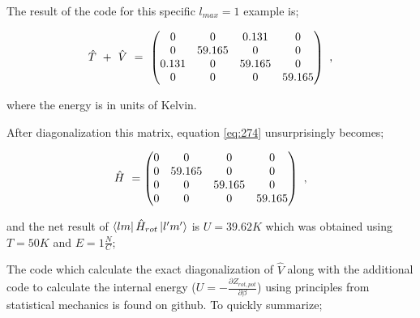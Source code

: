 \documentclass{article}
\begin{document}
The result of the code for this specific \begin{math} l_{max} = 1 \end{math} example is;

\begin{equation} \label{eq:274}
\hat{T} \hspace{0.125cm}  + \hspace{0.125cm} \hat{V} \hspace{0.125cm} = \hspace{0.125cm} \begin{pmatrix} 0 & 0 & 0.131 & 0 \\ 0 & 59.165 & 0 & 0 \\ 0.131 & 0 & 59.165 & 0 \\ 0 & 0 & 0 & 59.165 \end{pmatrix} \hspace{0.125cm} ,
\end{equation} 

where the energy is in units of Kelvin.

After diagonalization this matrix, equation \ref{eq:274} unsurprisingly becomes;

\begin{equation} \label{eq:275}
\hat{H} \hspace{0.125cm} = \begin{pmatrix} 0 & 0 & 0 & 0 \\ 0 & 59.165 & 0 & 0 \\ 0 & 0 & 59.165 & 0 \\ 0 & 0 & 0 & 59.165 \end{pmatrix} \hspace{0.125cm} ,
\end{equation} 

and the net result of \begin{math} \bra{l m}\hat{H}_{rot}\ket{l' m'} \end{math} is \begin{math} U = 39.62 K \end{math} which was obtained using \begin{math} T = 50 K \end{math} and \begin{math} E = 1 \frac{N}{C} \end{math};

The code which calculate the exact diagonalization of \begin{math} \hat{V} \end{math} along with the additional code to calculate the internal energy (\begin{math} U  = -\frac{\partial{Z_{rot,pot}}}{\partial{\beta}} \end{math})  using principles from statistical mechanics is found on
github. To quickly summarize; 
\end{document}
